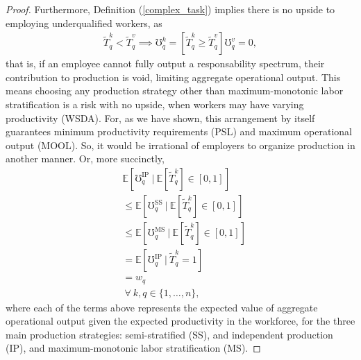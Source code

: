 \documentclass[hidelinks, nonatbib]{elsarticle}
\begin{document}
\begin{lemma}
\begin{proof}
        Furthermore, Definition (\ref{complex_task}) implies there is no upside to employing underqualified workers, as 
        \begin{gather}
            \tilde{T}_{q}^{k}
            <
            \tilde{T}_{q}^{v}
            \implies
            \mho_{q}^{k}
            =
            \left[
                \tilde{T}_{q}^{k}
                \geq
                \tilde{T}_{q}^{v}
            \right]
            \mho_{q}^{v}
            =
            0
            ,
        \end{gather}
        that is, if an employee cannot fully output a responsability spectrum, their contribution to production is void, limiting aggregate operational output. This means choosing any production strategy other than maximum-monotonic labor stratification is a risk with no upside, when workers may have varying productivity (WSDA). For, as we have shown, this arrangement by itself guarantees minimum productivity requirements (PSL) and maximum operational output (MOOL). So, it would be irrational of employers to organize production in another manner. Or, more succinctly,
        \begin{align}
            &\mathbb{E}[
                \mho_{q}^{\text{IP}}
                \
                |
                \
                \mathbb{E}[
                    \tilde{T}_{q}^{k}
                ]
                \in [0,1]
            ]
            \\
            &\leq
            \mathbb{E}[
                \mho_{q}^{\text{SS}}
                \
                |
                \
                \mathbb{E}[
                    \tilde{T}_{q}^{k}
                ]
                \in [0,1]
            ]
            \\
            &\leq
            \mathbb{E}[
                \mho_{q}^{\text{MS}}
                \
                |
                \
                \mathbb{E}[
                    \tilde{T}_{q}^{k}
                ]
                \in [0,1]
            ]
            \\
            &=
            \mathbb{E}[
                \mho_{q}^{\text{IP}}
                \
                |
                \
                \tilde{T}_{q}^{k}
                = 1
            ]
            \\
            &=
            w_q
            \\
            &
            \
            \forall
            \
            k,q \in \{1, \dots, n\}
            ,
        \end{align}
        where each of the terms above represents the expected value of aggregate operational output given the expected productivity in the workforce, for the three main production strategies: 
        semi-stratified (SS), and independent production (IP), and maximum-monotonic labor stratification (MS).


\end{proof}
\end{lemma}
\end{document}

